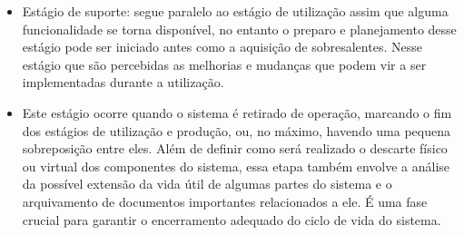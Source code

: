 \begin{itemize}
		\item Estágio de suporte: segue paralelo ao estágio de utilização assim que alguma funcionalidade se torna disponível, no entanto o preparo e planejamento desse estágio pode ser iniciado antes como a aquisição de sobresalentes. Nesse estágio que são percebidas as melhorias e mudanças que podem vir a ser implementadas durante a utilização.
		\item Este estágio ocorre quando o sistema é retirado de operação, marcando o fim dos estágios de utilização e produção, ou, no máximo, havendo uma pequena sobreposição entre eles. Além de definir como será realizado o descarte físico ou virtual dos componentes do sistema, essa etapa também envolve a análise da possível extensão da vida útil de algumas partes do sistema e o arquivamento de documentos importantes relacionados a ele. É uma fase crucial para garantir o encerramento adequado do ciclo de vida do sistema.
	\end{itemize}



